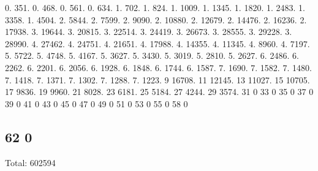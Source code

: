 0. 351. 0. 468. 0. 561. 0. 634. 1. 702. 1. 824. 1. 1009. 1. 1345. 1. 1820. 1. 2483. 1. 3358. 1. 4504. 2. 5844. 2. 7599. 2. 9090. 2. 10880. 2. 12679. 2. 14476. 2. 16236. 2. 17938. 3. 19644. 3. 20815. 3. 22514. 3. 24419. 3. 26673. 3. 28555. 3. 29228. 3. 28990. 4. 27462. 4. 24751. 4. 21651. 4. 17988. 4. 14355. 4. 11345. 4. 8960. 4. 7197. 5. 5722. 5. 4748. 5. 4167. 5. 3627. 5. 3430. 5. 3019. 5. 2810. 5. 2627. 6. 2486. 6. 2262. 6. 2201. 6. 2056. 6. 1928. 6. 1848. 6. 1744. 6. 1587. 7. 1690. 7. 1582. 7. 1480. 7. 1418. 7. 1371. 7. 1302. 7. 1288. 7. 1223. 9 16708. 11 12145. 13 11027. 15 10705. 17 9836. 19 9960. 21 8028. 23 6181. 25 5184. 27 4244. 29 3574. 31 0 33 0 35 0 37 0 39 0 41 0 43 0 45 0 47 0 49 0 51 0 53 0 55 0 58 0 \subsection*{62 0 }

Total\+: 602594 